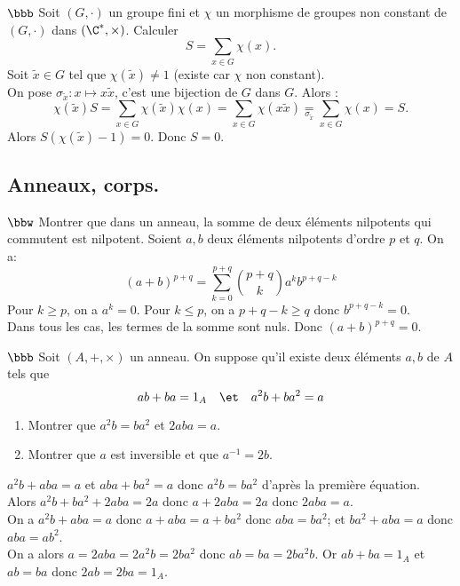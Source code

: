 \documentclass[11pt]{article}
\begin{document}
\begin{exercice}{$\bbb$}{}
    Soit $(G,\cdot)$ un groupe fini et $\chi$ un morphisme de groupes non constant de $(G,\cdot)$ dans $(\C^*,\times)$. Calculer
    \begin{equation*}
        S=\sum_{x\in G}\chi(x).
    \end{equation*}
    \tcblower
    Soit $\tilde{x}\in G$ tel que $\chi(\tilde{x})\neq1$ (existe car $\chi$ non constant).\\
    On pose $\sigma_{\tilde{x}}:x\mapsto x\tilde{x}$, c'est une bijection de $G$ dans $G$. Alors :
    \begin{equation*}
        \chi(\tilde{x})S=\sum_{x\in G}\chi(\tilde{x})\chi(x)=\sum_{x\in G}\chi(x\tilde{x})\underset{\sigma_{\tilde{x}}}{=}\sum_{x\in G}\chi(x)=S.
    \end{equation*}
    Alors $S(\chi(\tilde{x})-1)=0$. Donc $S=0$.
\end{exercice}

\subsection*{Anneaux, corps.}

\begin{exercice}{$\bbw$}{}
    Montrer que dans un anneau, la somme de deux éléments nilpotents qui commutent est nilpotent.
    \tcblower
    Soient $a,b$ deux éléments nilpotents d'ordre $p$ et $q$. On a:
    \begin{equation*}
        (a+b)^{p+q}=\sum_{k=0}^{p+q}\binom{p+q}{k}a^kb^{p+q-k}
    \end{equation*}
    Pour $k\geq p$, on a $a^{k}=0$. Pour $k\leq p$, on a $p+q-k\geq q$ donc $b^{p+q-k}=0$.\\
    Dans tous les cas, les termes de la somme sont nuls. Donc $(a+b)^{p+q}=0$.
\end{exercice}

\begin{exercice}{$\bbb$}{}
    Soit $(A,+,\times)$ un anneau. On suppose qu'il existe deux éléments $a,b$ de $A$ tels que
    \begin{equation*}
        ab+ba=1_A \quad\et\quad a^2b+ba^2=a
    \end{equation*}
    \begin{enumerate}
        \item Montrer que $a^2b=ba^2$ et $2aba=a$.
        \item Montrer que $a$ est inversible et que $a^{-1}=2b$.
    \end{enumerate}
    \tcblower
     $a^2b+aba=a$ et $aba+ba^2=a$ donc $a^2b=ba^2$ d'après la première équation.\\
    Alors $a^2b+ba^2+2aba=2a$ donc $a+2aba=2a$ donc $2aba=a$.\\
     On a $a^2b+aba=a$ donc $a+aba=a+ba^2$ donc $aba=ba^2$; et $ba^2+aba=a$ donc $aba=ab^2$.\\
    On a alors $a=2aba=2a^2b=2ba^2$ donc $ab=ba=2ba^2b$. Or $ab+ba=1_A$ et $ab=ba$ donc $2ab=2ba=1_A$.
\end{exercice}
\end{document}
